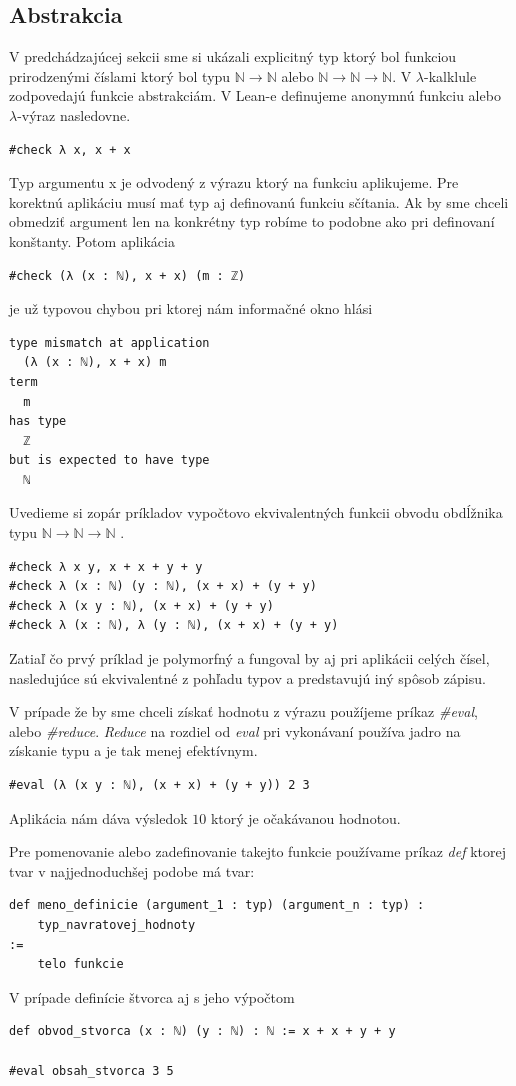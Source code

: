 \documentclass[a4paper,10pt,oneside]{report}%
\begin{document}
\subsection{Abstrakcia}
    V predchádzajúcej sekcii sme si ukázali explicitný typ ktorý bol funkciou prirodzenými
číslami ktorý bol typu $\mathbb{N} \to \mathbb{N}$ alebo $\mathbb{N} \to \mathbb{N} \to \mathbb{N}$.
    V $\lambda$-kalklule zodpovedajú funkcie abstrakciám. V Lean-e definujeme
anonymnú funkciu alebo $\lambda$-výraz nasledovne.
\begin{lstlisting}
#check λ x, x + x
\end{lstlisting}
    Typ argumentu x je odvodený z výrazu ktorý na funkciu aplikujeme.
    Pre korektnú aplikáciu musí mať typ aj definovanú funkciu sčítania.
    Ak by sme chceli obmedziť argument len na konkrétny typ robíme to podobne ako
pri definovaní konštanty. Potom aplikácia
\begin{lstlisting}
#check (λ (x : ℕ), x + x) (m : ℤ)
\end{lstlisting}
je už typovou chybou pri ktorej nám informačné okno hlási
\begin{lstlisting}
type mismatch at application
  (λ (x : ℕ), x + x) m
term
  m
has type
  ℤ
but is expected to have type
  ℕ
\end{lstlisting}
    Uvedieme si zopár príkladov vypočtovo ekvivalentných funkcii obvodu obdĺžnika typu
$\mathbb{N} \to \mathbb{N} \to \mathbb{N}$
.
\begin{lstlisting}
#check λ x y, x + x + y + y
#check λ (x : ℕ) (y : ℕ), (x + x) + (y + y)
#check λ (x y : ℕ), (x + x) + (y + y)
#check λ (x : ℕ), λ (y : ℕ), (x + x) + (y + y)
\end{lstlisting}
    Zatiaľ čo prvý príklad je polymorfný a fungoval by aj pri aplikácii celých čísel,
nasledujúce sú ekvivalentné z pohľadu typov a predstavujú iný spôsob zápisu.

    V prípade že by sme chceli získať hodnotu z výrazu použíjeme príkaz \emph{\#eval},
alebo \emph{\#reduce}. \emph{Reduce} na rozdiel od \emph{eval} pri vykonávaní používa
jadro na získanie typu a je tak menej efektívnym.
\begin{lstlisting}
#eval (λ (x y : ℕ), (x + x) + (y + y)) 2 3
\end{lstlisting}
    Aplikácia nám dáva výsledok $10$ ktorý je očakávanou hodnotou.

    Pre pomenovanie alebo zadefinovanie takejto funkcie používame príkaz \emph{def}
ktorej tvar v najjednoduchšej podobe má tvar:
\begin{lstlisting}
def meno_definicie (argument_1 : typ) (argument_n : typ) :
    typ_navratovej_hodnoty 
:=
    telo funkcie
\end{lstlisting}
V prípade definície štvorca aj s jeho výpočtom
\begin{lstlisting}
def obvod_stvorca (x : ℕ) (y : ℕ) : ℕ := x + x + y + y

#eval obsah_stvorca 3 5
\end{lstlisting}
\end{document}
